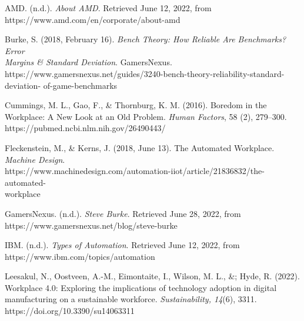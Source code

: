 \documentclass[12pt]{article}
\begin{document}



AMD. (n.d.). \emph{About AMD}. Retrieved June 12, 2022, from \\
\indent\hspace{0.5in} https://www.amd.com/en/corporate/about-amd 

Burke, S. (2018, February 16). \emph{Bench Theory: How Reliable Are Benchmarks? Error \\
\indent\hspace{0.5in} Margins \& Standard Deviation}. GamersNexus. \\
\indent\hspace{0.5in} https://www.gamersnexus.net/guides/3240-bench-theory-reliability-standard-deviation-
\indent\hspace{0.5in} of-game-benchmarks

Cummings, M. L., Gao, F., \& Thornburg, K. M. (2016). Boredom in the Workplace: A New 
\indent\hspace{0.5in} Look at an Old Problem. \emph{Human Factors}, 58 (2), 279–300. \\
\indent\hspace{0.5in} https://pubmed.ncbi.nlm.nih.gov/26490443/

Fleckenstein, M., \& Kerns, J. (2018, June 13). The Automated Workplace. \emph{Machine Design}. \\
\indent\hspace{0.5in} https://www.machinedesign.com/automation-iiot/article/21836832/the-automated-\\
\indent\hspace{0.5in} workplace

GamersNexus. (n.d.). \emph{Steve Burke}. Retrieved June 28, 2022, from \\
\indent\hspace{0.5in} https://www.gamersnexus.net/blog/steve-burke

IBM. (n.d.). \emph{Types of Automation}. Retrieved June 12, 2022, from \\
\indent\hspace{0.5in} https://www.ibm.com/topics/automation

Leesakul, N., Oostveen, A.-M., Eimontaite, I., Wilson, M. L., \&; Hyde, R. (2022). \\
\indent\hspace{0.5in} Workplace 4.0: Exploring the implications of technology adoption in digital \\
\indent\hspace{0.5in} manufacturing on a sustainable workforce. \emph{Sustainability, 14}(6), 3311. \\
\indent\hspace{0.5in} https://doi.org/10.3390/su14063311 
\end{document}

